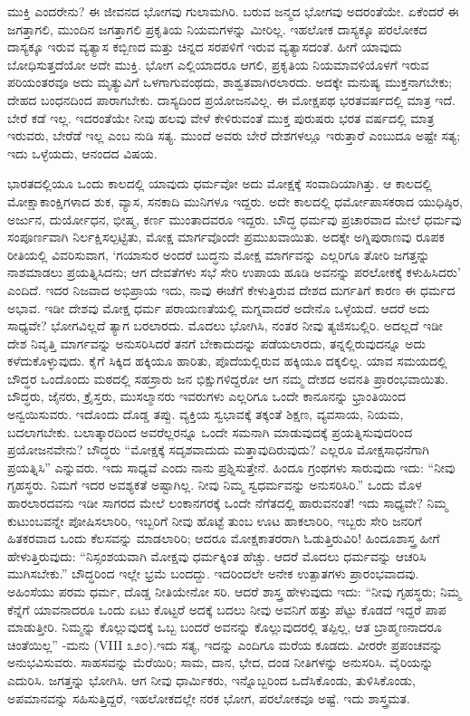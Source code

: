 ಮುಕ್ತಿ ಎಂದರೇನು? ಈ ಜೀವನದ ಭೋಗವು ಗುಲಾಮಗಿರಿ. ಬರುವ ಜನ್ಮದ ಭೋಗವು ಅದರಂತೆಯೇ. ಏಕೆಂದರೆ ಈ ಜಗತ್ತಾಗಲಿ, ಮುಂದಿನ ಜಗತ್ತಾಗಲಿ ಪ್ರಕೃತಿಯ ನಿಯಮಗಳನ್ನು ಮೀರಿಲ್ಲ. ಇಹಲೋಕ ದಾಸ್ಯಕ್ಕೂ ಪರಲೋಕದ ದಾಸ್ಯಕ್ಕೂ ಇರುವ ವ್ಯತ್ಯಾಸ ಕಬ್ಬಿಣದ ಮತ್ತು ಚಿನ್ನದ ಸರಪಳಿಗೆ ಇರುವ ವ್ಯತ್ಯಾಸದಂತೆ. ಹೀಗೆ ಯಾವುದು ಬೋಧಿಸುತ್ತದೆಯೋ ಅದೇ ಮುಕ್ತಿ. ಭೋಗ ಎಲ್ಲಿಯಾದರೂ ಆಗಲಿ, ಪ್ರಕೃತಿಯ ನಿಯಮಾ\break ವಳಿಯೊಳಗೆ ಇರುವ ಪರಿಯಂತರವೂ ಅದು ಮೃತ್ಯುವಿಗೆ ಒಳಗಾಗುವಂಥದು, ಶಾಶ್ವತ\break ವಾಗಿರಲಾರದು. ಅದಕ್ಕೇ ಮನುಷ್ಯ ಮುಕ್ತನಾಗಬೇಕು; ದೇಹದ ಬಂಧನದಿಂದ ಪಾರಾಗಬೇಕು. ದಾಸ್ಯದಿಂದ ಪ್ರಯೋಜನವಿಲ್ಲ. ಈ ಮೋಕ್ಷಪಥ ಭರತವರ್ಷದಲ್ಲಿ ಮಾತ್ರ ಇದೆ. ಬೇರೆ ಕಡೆ ಇಲ್ಲ. ಇದರಂತೆಯೇ ನೀವು ಹಲವು ವೇಳೆ ಕೇಳಿರುವಂತೆ ಮುಕ್ತ ಪುರುಷರು ಭರತ ವರ್ಷದಲ್ಲಿ ಮಾತ್ರ ಇರುವರು, ಬೇರೆಡೆ ಇಲ್ಲ ಎಂಬ ನುಡಿ ಸತ್ಯ. ಮುಂದೆ ಅವರು ಬೇರೆ ದೇಶಗಳಲ್ಲೂ ಇರುತ್ತಾರೆ ಎಂಬುದೂ ಅಷ್ಟೇ ಸತ್ಯ; ಇದು ಒಳ್ಳೆಯದು, ಆನಂದದ ವಿಷಯ.

ಭಾರತದಲ್ಲಿಯೂ ಒಂದು ಕಾಲದಲ್ಲಿ ಯಾವುದು ಧರ್ಮವೋ ಅದು ಮೋಕ್ಷಕ್ಕೆ ಸಂವಾದಿಯಾಗಿತ್ತು. ಆ ಕಾಲದಲ್ಲಿ ಮೋಕ್ಷಾಕಾಂಕ್ಷಿಗಳಾದ ಶುಕ, ವ್ಯಾಸ, ಸನಕಾದಿ ಮುನಿ\-ಗಳೂ ಇದ್ದರು. ಅದೇ ಕಾಲದಲ್ಲಿ ಧರ್ಮೋಪಾಸಕರಾದ ಯುಧಿಷ್ಠಿರ, ಅರ್ಜುನ, ದುರ್ಯೋ\break ಧನ, ಭೀಷ್ಮ, ಕರ್ಣ ಮುಂತಾದವರೂ ಇದ್ದರು. ಬೌದ್ಧ ಧರ್ಮವು ಪ್ರಚಾರವಾದ ಮೇಲೆ ಧರ್ಮವು ಸಂಪೂರ್ಣವಾಗಿ ನಿರ್ಲಕ್ಷಿಸಲ್ಪಟ್ಟಿತು, ಮೋಕ್ಷ ಮಾರ್ಗವೊಂದೇ ಪ್ರಮುಖ\break ವಾಯಿತು. ಅದಕ್ಕೇ ಅಗ್ನಿಪುರಾಣವು ರೂಪಕ ರೀತಿಯಲ್ಲಿ ವಿವರಿಸುವಾಗ, ‘ಗಯಾಸುರ ಅಂದರೆ ಬುದ್ಧನು ಮೋಕ್ಷ ಮಾರ್ಗವನ್ನು ಎಲ್ಲರಿಗೂ ತೋರಿ ಜಗತ್ತನ್ನು ನಾಶಮಾಡಲು ಪ್ರಯತ್ನಿಸಿದನು; ಆಗ ದೇವತೆಗಳು ಸಭೆ ಸೇರಿ ಉಪಾಯ ಹೂಡಿ ಅವನನ್ನು ಪರಲೋಕಕ್ಕೆ ಕಳುಹಿಸಿದರು’ ಎಂದಿದೆ. ಇದರ ನಿಜವಾದ ಅಭಿಪ್ರಾಯ ಇದು, ನಾವು ಈಚೆಗೆ ಕೇಳುತ್ತಿರುವ ದೇಶದ ದುರ್ಗತಿಗೆ ಕಾರಣ ಈ ಧರ್ಮದ ಅಭಾವ. ಇಡೀ ದೇಶವು ಮೋಕ್ಷ ಧರ್ಮ ಪರಾಯಣತೆಯಲ್ಲಿ ಮಗ್ನವಾದರೆ ಅದೇನೊ ಒಳ್ಳೆಯದೆ. ಆದರೆ ಅದು ಸಾಧ್ಯವೇ? ಭೋಗವಿಲ್ಲದೆ ತ್ಯಾಗ ಬರಲಾರದು. ಮೊದಲು ಭೋಗಿಸಿ, ನಂತರ ನೀವು ತ್ಯಜಿಸಬಲ್ಲಿರಿ. ಅದಲ್ಲದೆ ಇಡೀ ದೇಶ ನಿವೃತ್ತಿ ಮಾರ್ಗವನ್ನು ಅನುಸರಿಸಿದರೆ ತನಗೆ ಬೇಕಾದುದನ್ನು ಪಡೆಯಲಾರದು, ತನ್ನಲ್ಲಿರುವುದನ್ನೂ ಅದು ಕಳೆದುಕೊಳ್ಳುವುದು. ಕೈಗೆ ಸಿಕ್ಕಿದ ಹಕ್ಕಿಯೂ ಹಾರಿತು, ಪೊದೆಯಲ್ಲಿರುವ ಹಕ್ಕಿಯೂ ದಕ್ಕಲಿಲ್ಲ. ಯಾವ ಸಮಯದಲ್ಲಿ ಬೌದ್ಧರ ಒಂದೊಂದು ಮಠದಲ್ಲಿ ಸಹಸ್ರಾರು ಜನ ಭಿಕ್ಷುಗಳಿದ್ದರೋ ಆಗ ನಮ್ಮ ದೇಶದ ಅವನತಿ ಪ್ರಾರಂಭವಾಯಿತು. ಬೌದ್ಧರು, ಜೈನರು, ಕ್ರೈಸ್ತರು, ಮುಸಲ್ಮಾನರು ಇವರುಗಳು ಎಲ್ಲರಿಗೂ ಒಂದೇ ಕಾನೂನನ್ನು ಭ್ರಾಂತಿಯಿಂದ ಅನ್ವಯಿಸುವರು. ಇದೊಂದು ದೊಡ್ಡ ತಪ್ಪು. ವ್ಯಕ್ತಿಯ ಸ್ವಭಾವಕ್ಕೆ ತಕ್ಕಂತೆ ಶಿಕ್ಷಣ, ವ್ಯವಸಾಯ, ನಿಯಮ, ಬದಲಾಗಬೇಕು. ಬಲಾತ್ಕಾರದಿಂದ ಅವರೆಲ್ಲರನ್ನೂ ಒಂದೇ ಸಮನಾಗಿ ಮಾಡುವುದಕ್ಕೆ ಪ್ರಯತ್ನಿಸುವುದರಿಂದ ಪ್ರಯೋಜನವೇನು? ಬೌದ್ಧರು “ಮೋಕ್ಷಕ್ಕೆ ಸದೃಶವಾದುದು ಮತ್ತಾವುದಿರುವುದು? ಎಲ್ಲರೂ ಮೋಕ್ಷ\break ಸಾಧನೆಗಾಗಿ ಪ್ರಯತ್ನಿಸಿ” ಎನ್ನುವರು. ಇದು ಸಾಧ್ಯವೆ ಎಂದು ನಾನು ಪ್ರಶ್ನಿಸುತ್ತೇನೆ. ಹಿಂದೂ ಗ್ರಂಥಗಳು ಸಾರುವುದು ಇದು: “ನೀವು ಗೃಹಸ್ಥರು. ನಿಮಗೆ ಇದರ ಅವಶ್ಯಕತೆ ಅಷ್ಟಾಗಿಲ್ಲ. ನೀವು ನಿಮ್ಮ ಸ್ವಧರ್ಮವನ್ನು ಅನುಸರಿಸಿರಿ.” ಒಂದು ಮೊಳ ಹಾರಲಾರದವನು ಇಡೀ ಸಾಗರದ ಮೇಲೆ ಲಂಕಾನಗರಕ್ಕೆ ಒಂದೇ ನೆಗೆತದಲ್ಲಿ ಹಾರುವನಂತೆ! ಇದು ಸಾಧ್ಯವೇ? ನಿಮ್ಮ ಕುಟುಂಬವನ್ನೇ ಪೋಷಿಸಲಾರಿರಿ, ಇಬ್ಬರಿಗೆ ನೀವು ಹೊಟ್ಟೆ ತುಂಬ ಊಟ ಹಾಕಲಾರಿರಿ, ಇಬ್ಬರು ಸೇರಿ ಜನರಿಗೆ ಹಿತಕರವಾದ ಒಂದು ಕೆಲಸವನ್ನು ಮಾಡಲಾರಿರಿ; ಆದರೂ ಮೋಕ್ಷಕಾತರರಾಗಿ ಓಡುತ್ತಿರುವಿರಿ! ಹಿಂದೂಶಾಸ್ತ್ರ ಹೀಗೆ ಹೇಳುತ್ತಿರುವುದು: “ನಿಸ್ಸಂಶಯವಾಗಿ ಮೋಕ್ಷವು ಧರ್ಮಕ್ಕಿಂತ ಹೆಚ್ಚು. ಆದರೆ ಮೊದಲು ಧರ್ಮವನ್ನು ಆಚರಿಸಿ ಮುಗಿಸಬೇಕು.” ಬೌದ್ಧರಿಂದ ಇಲ್ಲೇ ಭ್ರಮೆ ಬಂದದ್ದು. ಇದರಿಂದಲೇ ಅನೇಕ ಉತ್ಪಾತಗಳು ಪ್ರಾರಂಭವಾದವು. ಅಹಿಂಸೆಯು ಪರಮ ಧರ್ಮ, ದೊಡ್ಡ ನೀತಿಯೇನೋ ಸರಿ. ಆದರೆ ಶಾಸ್ತ್ರ ಹೇಳುವುದು ಇದು: “ನೀವು ಗೃಹಸ್ಥರು; ನಿಮ್ಮ ಕೆನ್ನೆಗೆ ಯಾವನಾದರೂ ಒಂದು ಏಟು ಕೊಟ್ಟರೆ ಅದಕ್ಕೆ ಬದಲು ನೀವು ಅವನಿಗೆ ಹತ್ತು ಪೆಟ್ಟು ಕೊಡದೆ ಇದ್ದರೆ ಪಾಪ ಮಾಡುತ್ತೀರಿ. ನಿಮ್ಮನ್ನು ಕೊಲ್ಲುವುದಕ್ಕೆ ಒಬ್ಬ ಬಂದರೆ ಅವನನ್ನು ಕೊಲ್ಲುವುದರಲ್ಲಿ ತಪ್ಪಿಲ್ಲ, ಆತ ಬ್ರಾಹ್ಮಣನಾದರೂ ಚಿಂತೆಯಿಲ್ಲ” -ಮನು (VIII ೩೨೦).ಇದು ಸತ್ಯ, ಇದನ್ನು ಎಂದಿಗೂ ಮರೆಯ ಕೂಡದು. ವೀರರೇ ಪ್ರಪಂಚವನ್ನು ಅನುಭವಿಸುವರು. ಸಾಹಸವನ್ನು ಮೆರೆಯಿರಿ; ಸಾಮ, ದಾನ, ಭೇದ, ದಂಡ ನೀತಿಗಳನ್ನು ಅನುಸರಿಸಿ. ವೈರಿಯನ್ನು ಎದುರಿಸಿ. ಜಗತ್ತನ್ನು ಭೋಗಿಸಿ. ಆಗ ನೀವು ಧಾರ್ಮಿಕರು, ಇನ್ನೊಬ್ಬರಿಂದ ಒದೆಸಿಕೊಂಡು, ತುಳಿಸಿಕೊಂಡು, ಅಪಮಾನವನ್ನು ಸಹಿಸುತ್ತಿದ್ದರೆ, ಇಹಲೋಕದಲ್ಲೇ ನರಕ ಭೋಗ, ಪರಲೋಕವೂ ಅಷ್ಟೆ. ಇದು ಶಾಸ್ತ್ರಮತ. 